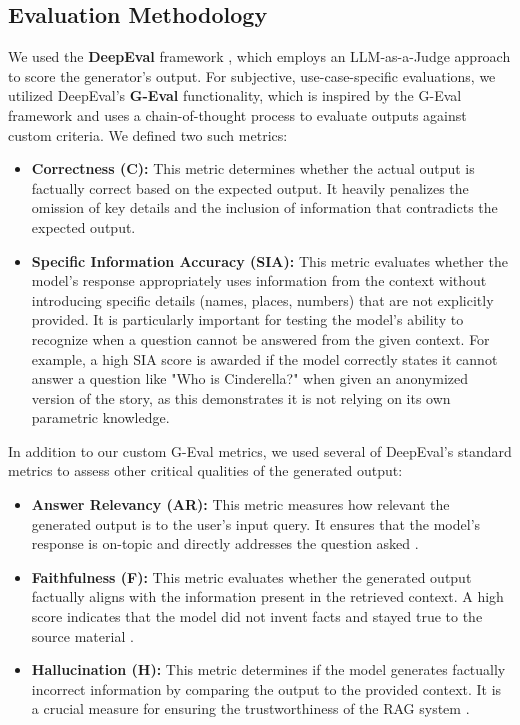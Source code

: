 \subsection{Evaluation Methodology}
We used the \textbf{DeepEval} framework \autocite{deepeval2023}, which employs an LLM-as-a-Judge approach to score the generator's output. For subjective, use-case-specific evaluations, we utilized DeepEval's \textbf{G-Eval} functionality, which is inspired by the G-Eval framework \autocite{liu2023geval} and uses a chain-of-thought process to evaluate outputs against custom criteria. We defined two such metrics:
\begin{itemize}
    \item \textbf{Correctness (C):} This metric determines whether the actual output is factually correct based on the expected output. It heavily penalizes the omission of key details and the inclusion of information that contradicts the expected output.
    \item \textbf{Specific Information Accuracy (SIA):} This metric evaluates whether the model's response appropriately uses information from the context without introducing specific details (names, places, numbers) that are not explicitly provided. It is particularly important for testing the model's ability to recognize when a question cannot be answered from the given context. For example, a high SIA score is awarded if the model correctly states it cannot answer a question like "Who is Cinderella?" when given an anonymized version of the story, as this demonstrates it is not relying on its own parametric knowledge.
\end{itemize}

In addition to our custom G-Eval metrics, we used several of DeepEval's standard metrics to assess other critical qualities of the generated output:
\begin{itemize}
    \item \textbf{Answer Relevancy (AR):} This metric measures how relevant the generated output is to the user's input query. It ensures that the model's response is on-topic and directly addresses the question asked \autocite{deepeval2023}.
    \item \textbf{Faithfulness (F):} This metric evaluates whether the generated output factually aligns with the information present in the retrieved context. A high score indicates that the model did not invent facts and stayed true to the source material \autocite{deepeval2023}.
    \item \textbf{Hallucination (H):} This metric determines if the model generates factually incorrect information by comparing the output to the provided context. It is a crucial measure for ensuring the trustworthiness of the RAG system \autocite{deepeval2023}.
\end{itemize}


